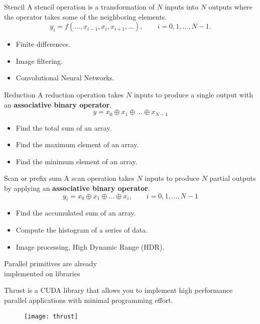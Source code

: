 \documentclass[xcolor={dvipsnames}]{beamer}
\begin{document}
\begin{frame}{Stencil}{}
A stencil operation is a transformation of $N$ inputs into $N$ outputs where the operator takes some of the neighboring elements.
\pause 
\begin{equation*}
y_i=f(\ldots,x_{i-1},x_i,x_{i+1},\ldots),\qquad i=0,1,\ldots,N-1.
\end{equation*}

\begin{itemize}[<+(1)->]
\item Finite differences.
\item Image filtering.
\item Convolutional Neural Networks.
\end{itemize}
\end{frame}

\begin{frame}{Reduction}{}
A reduction operation takes $N$ inputs to produce a single output with an \textbf{associative binary operator}.
\pause 
\begin{equation*}
y=x_0 \oplus x_1 \oplus ... \oplus x_{N-1}
\end{equation*}

\begin{itemize}[<+(1)->]
\item Find the total sum of an array.
\item Find the maximum element of an array.
\item Find the minimum element of an array.
\end{itemize}
\end{frame}

\begin{frame}{Scan or prefix sum}{}
A scan operation takes $N$ inputs to produce $N$ partial outputs by applying an \textbf{associative binary operator}.
\pause 
\begin{equation*}
y_i=x_0 \oplus x_1 \oplus ... \oplus x_{i}, \qquad i=0,1,\ldots,N-1
\end{equation*}

\begin{itemize}[<+(1)->]
\item Find the accumulated sum of an array.
\item Compute the histogram of a series of data.
\item Image processing, High Dynamic Range (HDR).
\end{itemize}
\end{frame}

\begin{frame}{Parallel primitives are already\\ implemented on libraries}{}

Thrust is a CUDA library that allows you to implement high performance parallel applications with minimal programming effort.

\vfill
\begin{figure}
\centering
\texttt{[image: thrust]}
\label{fig:thrust}
\end{figure}
\end{frame}
\end{document}
